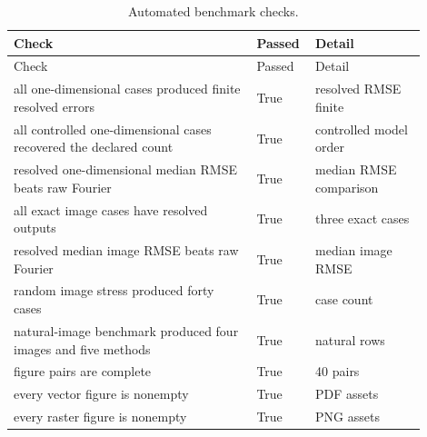 \begin{longtable}{p{0.55\linewidth}p{0.10\linewidth}p{0.25\linewidth}}
\caption{Automated benchmark checks.}\label{tab:checks}\\
\toprule
Check & Passed & Detail\\
\midrule\endfirsthead
\toprule Check & Passed & Detail\\\midrule\endhead
all one-dimensional cases produced finite resolved errors & True & resolved RMSE finite\\
all controlled one-dimensional cases recovered the declared count & True & controlled model order\\
resolved one-dimensional median RMSE beats raw Fourier & True & median RMSE comparison\\
all exact image cases have resolved outputs & True & three exact cases\\
resolved median image RMSE beats raw Fourier & True & median image RMSE\\
random image stress produced forty cases & True & case count\\
natural-image benchmark produced four images and five methods & True & natural rows\\
figure pairs are complete & True & 40 pairs\\
every vector figure is nonempty & True & PDF assets\\
every raster figure is nonempty & True & PNG assets\\
\bottomrule
\end{longtable}